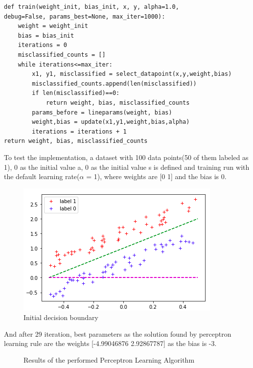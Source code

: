 \documentclass[onecolumn]{article}
\begin{document}
\begin{lstlisting}
def train(weight_init, bias_init, x, y, alpha=1.0,
debug=False, params_best=None, max_iter=1000):
	weight = weight_init
	bias = bias_init
	iterations = 0
	misclassified_counts = [] 
	while iterations<=max_iter:
		x1, y1, misclassified = select_datapoint(x,y,weight,bias)
		misclassified_counts.append(len(misclassified))
		if len(misclassified)==0:
			return weight, bias, misclassified_counts
		params_before = lineparams(weight, bias)
		weight,bias = update(x1,y1,weight,bias,alpha)
		iterations = iterations + 1
return weight, bias, misclassified_counts
\end{lstlisting}
To test the implementation, a dataset with 100 data points(50 of them labeled as 1), 0 as the initial value a, 0 as the initial value s is defined and training run with the default learning rate($\alpha$ = 1), where weights are [0 1] and the bias is 0.\newline
\begin{figure}[h]
	\centering
	\includegraphics[width=.4\linewidth]{fig/initial.png}
	\caption{\label{fig:initial}
		Initial decision boundary}
\end{figure}\newline 
And after 29 iteration, best parameters as the solution found by perceptron learning rule are the weights [-4.99046876  2.92867787] as the bias is -3.

\begin{figure}[h]
	\centering
	\caption{\label{fig:solution} 
		Results of the performed Perceptron Learning Algorithm }
\end{figure}
\end{document}
